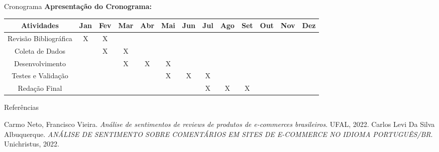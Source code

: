 \documentclass{beamer}
\begin{document}
\begin{frame}{Cronograma}
    \textbf{Apresentação do Cronograma:}
    
    \begin{table}[]
        \begin{tabular}{|c|c|c|c|c|c|c|c|c|c|c|c|c|}
            \hline
            Atividades & Jan & Fev & Mar & Abr & Mai & Jun & Jul & Ago & Set & Out & Nov & Dez \\ \hline
            Revisão Bibliográfica & X & X & & & & & & & & & & \\ \hline
            Coleta de Dados & & X & X & & & & & & & & & \\ \hline
            Desenvolvimento & & & X & X & X & & & & & & & \\ \hline
            Testes e Validação & & & & & X & X & X & & & & & \\ \hline
            Redação Final & & & & & & & X & X & X & & & \\ \hline
        \end{tabular}
    \end{table}
\end{frame}

\begin{frame}{Referências}
    \begin{thebibliography}{99}
         Carmo Neto, Francisco Vieira. \textit{Análise de sentimentos de reviews de produtos de e-commerces brasileiros}. UFAL, 2022.
         Carlos Levi Da Silva Albuquerque. \textit{ANÁLISE DE SENTIMENTO SOBRE COMENTÁRIOS EM SITES DE E-COMMERCE
NO IDIOMA PORTUGUÊS/BR}. Unichristus, 2022.
    \end{thebibliography}
\end{frame}
\end{document}
